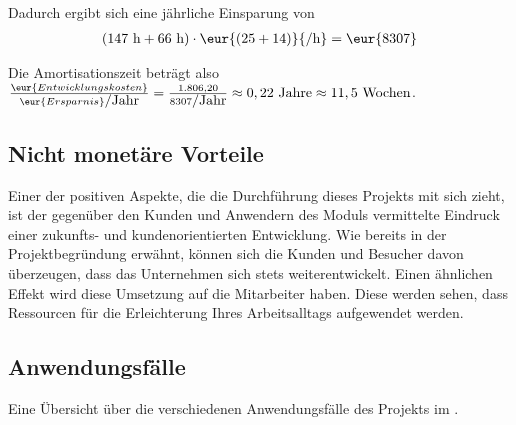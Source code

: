 Dadurch ergibt sich eine jährliche Einsparung von 
\begin{eqnarray}
(147 \mbox{ h} + 66 \mbox{ h}) \cdot \eur{(25 + 14)}{\mbox{/h}} = \eur{8307}
\end{eqnarray}

Die Amortisationszeit beträgt also $\frac{\eur{Entwicklungskosten}}{\eur{Ersparnis}\mbox{/Jahr}} = \frac{1.806,20}{8307\mbox{/Jahr}} \approx 0,22 \mbox{ Jahre} \approx 11,5 \mbox{ Wochen}$.


%

\subsection{Nicht monetäre Vorteile}
\label{sec:NichtmonotaereVorteile}
Einer der positiven Aspekte, die die Durchführung dieses Projekts mit sich zieht, ist der gegenüber den Kunden und Anwendern des Moduls vermittelte Eindruck einer zukunfts- und kundenorientierten Entwicklung.
Wie bereits in der Projektbegründung erwähnt, können sich die Kunden und Besucher davon überzeugen, dass das Unternehmen sich stets weiterentwickelt.
Einen ähnlichen Effekt wird diese Umsetzung auf die Mitarbeiter haben.
Diese werden sehen, dass Ressourcen für die Erleichterung Ihres Arbeitsalltags aufgewendet werden.


\subsection{Anwendungsfälle}
\label{sec:Anwendungsfaelle}
%
Eine Übersicht über die verschiedenen Anwendungsfälle des Projekts im .


